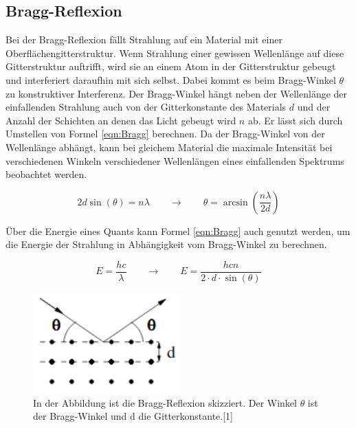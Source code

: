 \documentclass[titlepage = firstcover]{scrartcl}
\begin{document}
            \FloatBarrier



        \subsection{Bragg-Reflexion}
            Bei der Bragg-Reflexion fällt Strahlung auf ein Material mit einer Oberflächengitterstruktur. Wenn Strahlung einer gewissen Wellenlänge auf diese Gitterstruktur auftrifft, wird sie 
            an einem Atom in der Gitterstruktur gebeugt und interferiert daraufhin mit sich selbst. Dabei kommt es beim Bragg-Winkel $\theta$ zu konstruktiver Interferenz. Der Bragg-Winkel hängt
            neben der Wellenlänge der einfallenden Strahlung auch von der Gitterkonstante des Materials $d$ und der Anzahl der Schichten an denen das Licht gebeugt wird $n$ ab. Er lässt sich
            durch Umstellen von Formel \ref{eqn:Bragg} berechnen. Da der Bragg-Winkel von der Wellenlänge abhängt, kann bei gleichem Material die maximale Intensität bei verschiedenen 
            Winkeln verschiedener Wellenlängen eines einfallenden Spektrums beobachtet werden.

            \begin{equation}
              2d\sin(\theta) = n\lambda \qquad \longrightarrow \qquad \theta = \arcsin(\frac{n\lambda}{2d})
              \label{eqn:Bragg}
            \end{equation}

            \noindent
            Über die Energie eines Quants kann Formel \ref{eqn:Bragg} auch genutzt werden, um die Energie der Strahlung in Abhängigkeit vom Bragg-Winkel zu berechnen.
            
            \begin{equation}
              E = \frac{hc}{\lambda} \qquad \longrightarrow \qquad E = \frac{hcn}{2\cdot d \cdot \sin(\theta)}
              \label{eqn:Energie}
            \end{equation}

            \FloatBarrier

            \begin{figure}[h]
              \centering
              \includegraphics[width = 0.5\textwidth]{skizzebragg.png}
              \caption{In der Abbildung ist die Bragg-Reflexion skizziert. Der Winkel $\theta$ ist der Bragg-Winkel und d die Gitterkonstante.[1]}
              \label{fig:SkizzeBragg}
            \end{figure}
\end{document}
